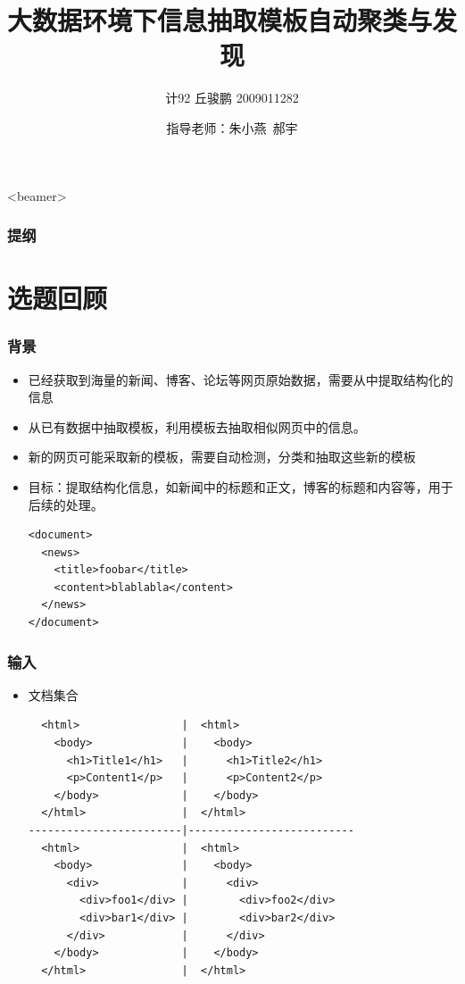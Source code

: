 \documentclass[11pt,presentation]{beamer}
\title{大数据环境下信息抽取模板自动聚类与发现}
\author{计92 丘骏鹏 2009011282}
\date{指导老师：朱小燕~郝宇}
\begin{document}
\maketitle



\begin{frame}<beamer>\frametitle{提纲}\tableofcontents\end{frame}
\section{选题回顾}
\label{sec-1}
\begin{frame}[fragile]
\frametitle{背景}
\label{sec-1-1}

\begin{itemize}
\item 已经获取到海量的新闻、博客、论坛等网页原始数据，需要从中提取结构化的信息
\item 从已有数据中抽取模板，利用模板去抽取相似网页中的信息。
\item 新的网页可能采取新的模板，需要自动检测，分类和抽取这些新的模板
\item 目标：提取结构化信息，如新闻中的标题和正文，博客的标题和内容等，用于后续的处理。
  \tiny

\lstset{extendedchars=false,basicstyle=\ttfamily\footnotesize,escapechar=`,breaklines,language=nxml}
\begin{lstlisting}
<document>
  <news>
    <title>foobar</title>
    <content>blablabla</content>
  </news>
</document>
\end{lstlisting}
\end{itemize}
\end{frame}
\begin{frame}[fragile]
\frametitle{输入}
\label{sec-1-2}
\begin{itemize}

\item 文档集合\\
\label{sec-1-2-1}%
\lstset{extendedchars=false,basicstyle=\ttfamily\footnotesize,escapechar=`,breaklines,language=HTML}
\begin{lstlisting}
  <html>                |  <html>
    <body>              |    <body>
      <h1>Title1</h1>   |      <h1>Title2</h1>
      <p>Content1</p>   |      <p>Content2</p>
    </body>             |    </body>
  </html>               |  </html>
------------------------|--------------------------
  <html>                |  <html>
    <body>              |    <body>
      <div>             |      <div>
        <div>foo1</div> |        <div>foo2</div>
        <div>bar1</div> |        <div>bar2</div>
      </div>            |      </div>
    </body>             |    </body>
  </html>               |  </html>
\end{lstlisting}

\end{itemize} %
\end{frame}
\end{document}

